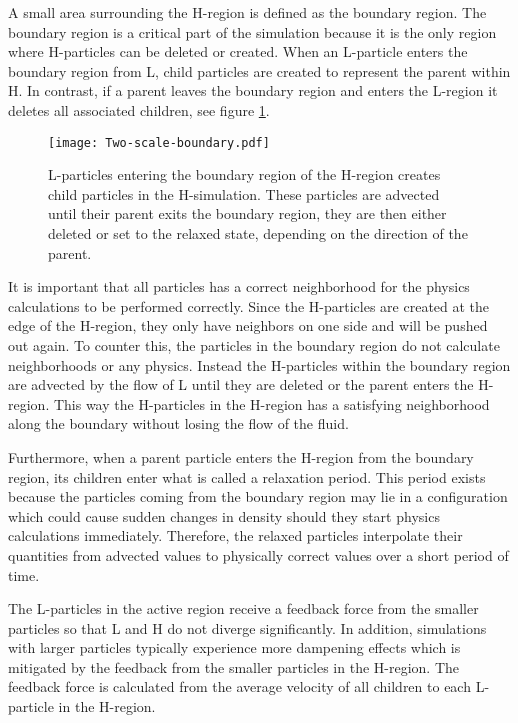 \documentclass[../../main.tex]{subfiles}
\begin{document}
A small area surrounding the H-region is defined as the boundary region. The boundary region is a critical part of the simulation because it is the only region where H-particles can be deleted or created. When an L-particle enters the boundary region from L, child particles are created to represent the parent within H. In contrast, if a parent leaves the boundary region and enters the L-region it deletes all associated children, see figure \ref{fig:boundary}. 

\begin{figure}[h!]
    \centering
    \texttt{[image: Two-scale-boundary.pdf]}
    \caption[Two-scale H-region boundary handling]{ L-particles entering the boundary region of the H-region creates child particles in the H-simulation. These particles are advected until their parent exits the boundary region, they are then either deleted or set to the relaxed state, depending on the direction of the parent.  }
    \label{fig:boundary}
\end{figure}

It is important that all particles has a correct neighborhood for the physics calculations to be performed correctly. Since the H-particles are created at the edge of the H-region, they only have neighbors on one side and will be pushed out again. To counter this, the particles in the boundary region do not calculate neighborhoods or any physics. Instead the H-particles within the boundary region are advected by the flow of L until they are deleted or the parent enters the H-region. This way the H-particles in the H-region has a satisfying neighborhood along the boundary without losing the flow of the fluid. 

Furthermore, when a parent particle enters the H-region from the boundary region, its children enter what is called a relaxation period. This period exists because the particles coming from the boundary region may lie in a configuration which could cause sudden changes in density should they start physics calculations immediately. Therefore, the relaxed particles interpolate their quantities from advected values to physically correct values over a short period of time. 

The L-particles in the active region receive a feedback force from the smaller particles so that L and H do not diverge significantly. In addition, simulations with larger particles typically experience more dampening effects which is mitigated by the feedback from the smaller particles in the H-region. The feedback force is calculated from the average velocity of all children to each L-particle in the H-region. 
\end{document}
